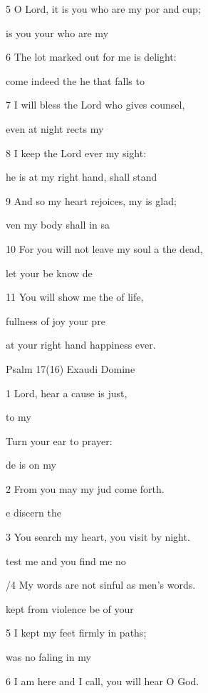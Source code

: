 5 O Lord, it is you who are my por and cup; 

 is you your who are my  

6 The lot marked out for me is  delight: 

come indeed the he that falls to  

7 I will bless the Lord who gives  counsel, 

 even at night rects my  

8 I keep the Lord ever  my sight: 

 he is at my right hand,  shall stand  

9 And so my heart rejoices, my  is glad; 

ven my body shall  in sa 

10 For you will not leave my soul a the dead, 

 let your be know de 

11 You will show me the  of life, 

 fullness of joy  your pre 

at your right hand happiness  ever. 

Psalm 17(16) Exaudi Domine 


1 Lord, hear a cause  is just, 

  to my  

Turn your ear to  prayer: 

 de is on my  

2 From you may my jud come forth. 

 e discern the  

3 You search my heart, you visit  by night. 

 test me and you find  me no  

/4 My words are not sinful as  men's words. 

 kept from violence be of your  

5 I kept my feet firmly in  paths; 

 was no faling in my  

6 I am here and I call, you will hear  O God. 


